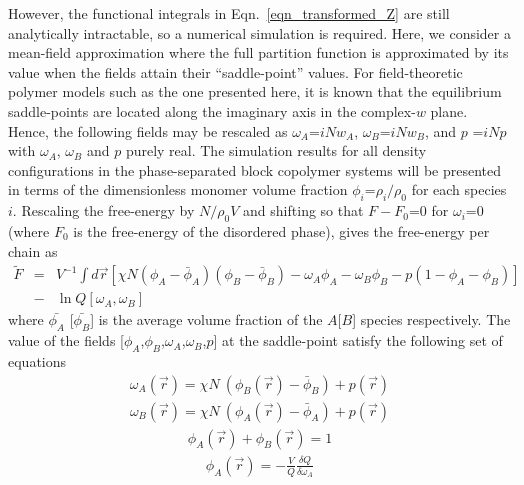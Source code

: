 \documentclass[onecolumn,amsmath,amssymb,floatfix]{elsart}
\begin{document}
However, the functional integrals in Eqn.~\ref{eqn_transformed_Z} are still
analytically intractable, so a numerical simulation is required.
Here, we consider a mean-field approximation where the full
partition function is approximated by its value when the fields
attain their ``saddle-point'' values.
For field-theoretic polymer models such
as the one presented here, it is known that \cite{glenn_review_02}
the equilibrium saddle-points are located along the imaginary axis in
the complex-$w$ plane. 
Hence, the following fields may be rescaled
as $\omega_A$=$i N w_A$, $\omega_B$=$i N w_B$, and $p$  =$i N p$
with $\omega_A$, $\omega_B$ and $p$ purely real.
The simulation results for all density configurations in the phase-separated
block copolymer systems will be presented in terms of the
dimensionless monomer volume fraction $\phi_i$=$\rho_i / \rho_0$ for each species $i$.
Rescaling the free-energy by
$N/\rho_0 V$ and shifting so that $F-F_0$=$0$ for $\omega_i$=$0$
(where $F_0$ is the free-energy of the disordered phase),
gives the free-energy per chain as
%
 \begin{eqnarray}
 \label{eqn_free_energy_shifted}
 {\tilde F}
 \nonumber
 & = &
  V^{-1} \int d{\vec r}
   \left [
     \chi N (\phi_A - \bar{\phi}_A)
            (\phi_B - \bar{\phi}_B)
     - \omega_A \phi_A
     - \omega_B \phi_B
     - p(1 - \phi_A - \phi_B)
   \right ] \\
 & - & \ln Q[\omega_A,\omega_B]
 \end{eqnarray}
%
where $\bar{\phi_A}$ [$\bar{\phi_B}$] is the average
volume fraction of the $A$[$B$] species respectively.
The value of
the fields [$\phi_A$,$\phi_B$,$\omega_A$,$\omega_B$,$p$] at the
saddle-point satisfy the following set of equations
%
 \begin{eqnarray}
   \label{eqn_self_consistent_set_1}
   \omega_A({\vec r}) = \chi N \ (\phi_B({\vec r})-\bar{\phi}_B) + p({\vec r})
 \end{eqnarray}
%
 \begin{eqnarray}
   \label{eqn_self_consistent_set_2}
   \omega_B({\vec r}) = \chi N \ (\phi_A({\vec r})-\bar{\phi}_A) + p({\vec r})
 \end{eqnarray}
%
 \begin{eqnarray}
   \label{eqn_self_consistent_set_3}
   \phi_A({\vec r}) + \phi_B({\vec r}) = 1
 \end{eqnarray}
%
 \begin{eqnarray}
   \label{eqn_self_consistent_set_4}
   \phi_A({\vec r}) = - \frac{V}{Q} \frac{\delta Q}{\delta \omega_A}
 \end{eqnarray}
\end{document}
